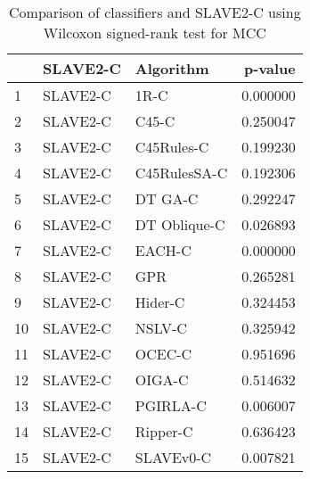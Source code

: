 \begin{table}
\footnotesize
\caption{Comparison of classifiers and SLAVE2-C using Wilcoxon signed-rank test for MCC}
\label{tab:SLAVE2-C wilcoxon MCC comparison}
\begin{tabular}{lllr}
\hline
 & SLAVE2-C & Algorithm & p-value \\
\hline
1 & SLAVE2-C & 1R-C & 0.000000 \\
2 & SLAVE2-C & C45-C & 0.250047 \\
3 & SLAVE2-C & C45Rules-C & 0.199230 \\
4 & SLAVE2-C & C45RulesSA-C & 0.192306 \\
5 & SLAVE2-C & DT GA-C & 0.292247 \\
6 & SLAVE2-C & DT Oblique-C & 0.026893 \\
7 & SLAVE2-C & EACH-C & 0.000000 \\
8 & SLAVE2-C & GPR & 0.265281 \\
9 & SLAVE2-C & Hider-C & 0.324453 \\
10 & SLAVE2-C & NSLV-C & 0.325942 \\
11 & SLAVE2-C & OCEC-C & 0.951696 \\
12 & SLAVE2-C & OIGA-C & 0.514632 \\
13 & SLAVE2-C & PGIRLA-C & 0.006007 \\
14 & SLAVE2-C & Ripper-C & 0.636423 \\
15 & SLAVE2-C & SLAVEv0-C & 0.007821 \\
\hline
\end{tabular}
\end{table}

